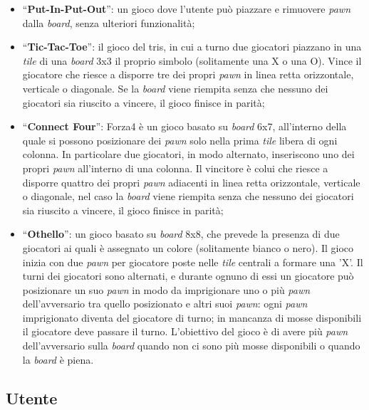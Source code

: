 \begin{itemize}
    \item ``\textbf{Put-In-Put-Out}'': un gioco dove l'utente può piazzare e rimuovere \textit{pawn} dalla \textit{board}, senza ulteriori funzionalità;
    \item ``\textbf{Tic-Tac-Toe}'': il gioco del tris, in cui a turno due giocatori piazzano in una \textit{tile} di una \textit{board} 3x3 il proprio simbolo (solitamente una X o una O). Vince il giocatore che riesce a disporre tre dei propri \textit{pawn} in linea retta orizzontale, verticale o diagonale. Se la \textit{board} viene riempita senza che nessuno dei giocatori sia riuscito a vincere, il gioco finisce in parità;
    \item ``\textbf{Connect Four}'': Forza4 è un gioco basato su \textit{board} 6x7, all'interno della quale si possono posizionare dei \textit{pawn} solo nella prima \textit{tile} libera di ogni colonna. In particolare due giocatori, in modo alternato, inseriscono uno dei propri \textit{pawn} all'interno di una colonna. Il vincitore è colui che riesce a disporre quattro dei propri \textit{pawn} adiacenti in linea retta orizzontale, verticale o diagonale, nel caso la \textit{board} viene riempita senza che nessuno dei giocatori sia riuscito a vincere, il gioco finisce in parità;
    \item ``\textbf{Othello}'': un gioco basato su \textit{board} 8x8, che prevede la presenza di due giocatori ai quali è assegnato un colore (solitamente bianco o nero). Il gioco inizia con due \textit{pawn} per giocatore poste nelle \textit{tile} centrali a formare una 'X'. Il turni dei giocatori sono alternati, e durante ognuno di essi un giocatore può posizionare un suo \textit{pawn} in modo da imprigionare uno o più \textit{pawn} dell'avversario tra quello posizionato e altri suoi \textit{pawn}: ogni \textit{pawn} imprigionato diventa del giocatore di turno; in mancanza di mosse disponibili il giocatore deve passare il turno. L'obiettivo del gioco è di avere più \textit{pawn} dell'avversario sulla \textit{board} quando non ci sono più mosse disponibili o quando la \textit{board} è piena.
\end{itemize}

\subsection{Utente}

